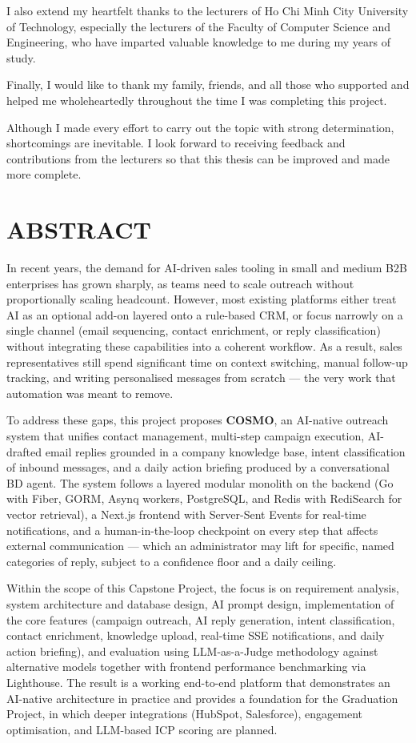 \documentclass[a4paper]{article}
\begin{document}
I also extend my heartfelt thanks to the lecturers of Ho Chi Minh City
University of Technology, especially the lecturers of the Faculty of
Computer Science and Engineering, who have imparted valuable knowledge to
me during my years of study.

Finally, I would like to thank my family, friends, and all those who
supported and helped me wholeheartedly throughout the time I was
completing this project.

Although I made every effort to carry out the topic with strong
determination, shortcomings are inevitable. I look forward to receiving
feedback and contributions from the lecturers so that this thesis can be
improved and made more complete.

\newpage
\section*{ABSTRACT}

In recent years, the demand for AI-driven sales tooling in small and
medium B2B enterprises has grown sharply, as teams need to scale outreach
without proportionally scaling headcount. However, most existing
platforms either treat AI as an optional add-on layered onto a rule-based
CRM, or focus narrowly on a single channel (email sequencing, contact
enrichment, or reply classification) without integrating these
capabilities into a coherent workflow. As a result, sales representatives
still spend significant time on context switching, manual follow-up
tracking, and writing personalised messages from scratch --- the very
work that automation was meant to remove.

To address these gaps, this project proposes \textbf{COSMO}, an AI-native
outreach system that unifies contact management, multi-step campaign
execution, AI-drafted email replies grounded in a company knowledge base,
intent classification of inbound messages, and a daily action briefing
produced by a conversational BD agent. The system follows a layered
modular monolith on the backend (Go with Fiber, GORM, Asynq workers,
PostgreSQL, and Redis with RediSearch for vector retrieval), a Next.js
frontend with Server-Sent Events for real-time notifications, and a
human-in-the-loop checkpoint on every step that affects external
communication --- which an administrator may lift for specific, named
categories of reply, subject to a confidence floor and a daily ceiling.

Within the scope of this Capstone Project, the focus is on requirement
analysis, system architecture and database design, AI prompt design,
implementation of the core features (campaign outreach, AI reply
generation, intent classification, contact enrichment, knowledge upload,
real-time SSE notifications, and daily action briefing), and evaluation
using LLM-as-a-Judge methodology against alternative models together
with frontend performance benchmarking via Lighthouse. The result is a
working end-to-end platform that demonstrates an AI-native architecture
in practice and provides a foundation for the Graduation Project, in
which deeper integrations (HubSpot, Salesforce), engagement
optimisation, and LLM-based ICP scoring are planned.
\end{document}
